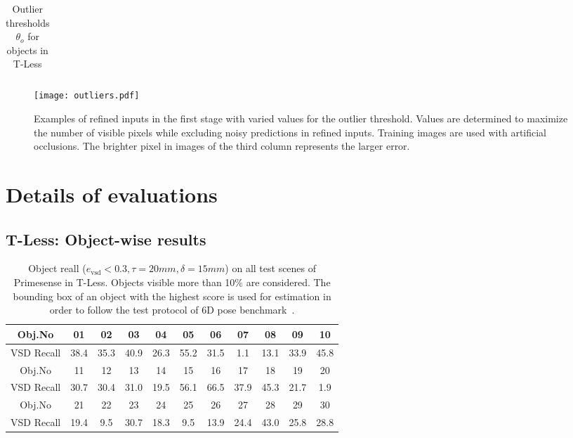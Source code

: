 \documentclass[10pt,twocolumn,letterpaper]{article}
\begin{document}
\begin{itemize}
{\begin{table}[hbt]
\begin{center}
\begin{tabular}{ c| c c c c c c c c c c c c c c c c c c c c c c c c c c c c c c}
\end{tabular}
\end{center}
\caption{Outlier thresholds $\theta_o$ for objects in T-Less}
\end{table}

\begin{figure}[hbt]
\begin{center}
   \texttt{[image: outliers.pdf]}
\end{center}
\caption{Examples of refined inputs in the first stage with varied values for the outlier threshold. Values are determined to maximize the number of visible pixels while excluding noisy predictions in refined inputs. Training images are used with artificial occlusions. The brighter pixel in images of the third column represents the larger error.}
\label{fig:outlier}
\end{figure}
}
\end{itemize}


\newpage
\section{Details of evaluations}
\vspace{5pt}

\subsection{T-Less: Object-wise results}
\setlength{\tabcolsep}{12pt}

\begin{table}[hbt]\centering \begin{center}
\begin{tabular}{ c| c c c c c c c c c c}
  \hline
 Obj.No &01 &02 & 03 & 04 & 05 & 06 & 07 & 08 & 09 & 10  \\
 \hline
 VSD Recall   &38.4 &35.3& 40.9 & 26.3 & 55.2 & 31.5 &1.1 & 13.1 & 33.9 &45.8  \\
  \hline
  \hline
  Obj.No& 11 & 12 & 13 & 14 & 15 &16 & 17 & 18 & 19 & 20  \\
 \hline
 VSD Recall & 30.7 & 30.4 &31.0 & 19.5 & 56.1  &66.5&37.9 &45.3& 21.7 & 1.9   \\
 \hline
 \hline
  Obj.No & 21 & 22 & 23 & 24 & 25 &26 & 27 & 28 & 29& 30 \\
 \hline
 VSD Recall&19.4 & 9.5 &30.7 & 18.3 & 9.5 &13.9 & 24.4 & 43.0 & 25.8 & 28.8     \\
 \hline
 
 \end{tabular}
 \vspace{+1em}
\caption{Object reall ($e_\textrm{vsd} < 0.3, \tau=20mm, \delta=15mm$) on all test scenes of Primesense in T-Less. Objects visible more than 10\% are considered. The bounding box of an object with the highest score is used for estimation in order to follow the test protocol of 6D pose benchmark~\cite{Hodan_2018_ECCV_bop}.}
\label{table:t-less}
\end{center}
\end{table}
\end{document}
